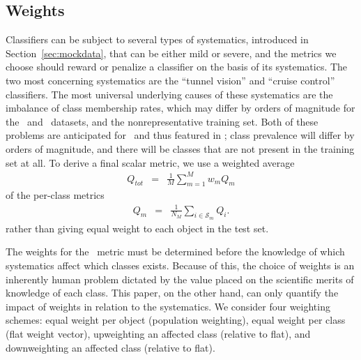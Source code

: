 \subsection{Weights}
\label{sec:weights}

Classifiers can be subject to several types of systematics, introduced in Section~\ref{sec:mockdata}, that can be either mild or severe, and the metrics we choose should reward or penalize a classifier on the basis of its systematics.
The two most concerning systematics are the ``tunnel vision'' and ``cruise control'' classifiers.
The most universal underlying causes of these systematics are the imbalance of class membership rates, which may differ by orders of magnitude for the \plasticc\ and \lsst\ datasets, and the nonrepresentative training set.
Both of these problems are anticipated for \lsst\ and thus featured in \plasticc; class prevalence will differ by orders of magnitude, and there will be classes that are not present in the training set at all.
To derive a final scalar metric, we use a weighted average
\begin{eqnarray}
Q_{tot} &=& \frac{1}{M}\sum_{m=1}^{M}w_{m}Q_{m}
\end{eqnarray}
of the per-class metrics
\begin{eqnarray}
Q_{m} &=& \frac{1}{N_{M}}\sum_{i\in\mathcal{S}_{m}}Q_{i}.
\end{eqnarray}
rather than giving equal weight to each object in the test set.

The weights for the \plasticc\ metric must be determined before the knowledge of which systematics affect which classes exists.
Because of this, the choice of weights is an inherently human problem dictated by the value placed on the scientific merits of knowledge of each class.
This paper, on the other hand, can only quantify the impact of weights in relation to the systematics.
We consider four weighting schemes: equal weight per object (population weighting), equal weight per class (flat weight vector), upweighting an affected class (relative to flat), and downweighting an affected class (relative to flat).

%
